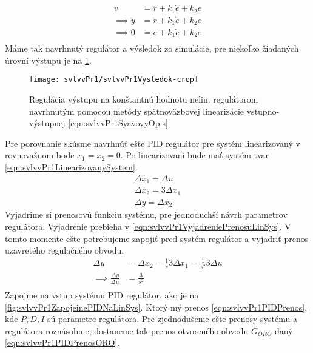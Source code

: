 \documentclass[../main.tex]{subfiles}
\begin{document}
	\begin{equation}
	\begin{aligned}
	v &= \ddot{r}  +k_1 \dot{e} + k_2 e \\
	\implies \ddot{y} &= \ddot{r}  +k_1 \dot{e} + k_2 e \\
	\implies 0 &= \ddot{e}  + k_1 \dot{e} + k_2 e \\
	\end{aligned}
	\label{eqn:svlvvPr1DynamikaOdchylky}
	\end{equation}
	Máme tak navrhnutý regulátor a výsledok zo simulácie, pre niekoľko žiadaných úrovní výstupu je na \cref{fig:svlvvPr1Vysledok}.
	\begin{figure}[h!]
		\centering
		\texttt{[image: svlvvPr1/svlvvPr1Vysledok-crop]}
		\caption{Regulácia výstupu na konštantnú hodnotu nelin. regulátorom navrhnutým pomocou metódy spätnoväzbovej linearizácie vstupno-výstupnej \cref{eqn:svlvvPr1SyavovyOpis}}
		\label{fig:svlvvPr1Vysledok}
	\end{figure}
	Pre porovnanie skúsme navrhnúť ešte PID regulátor pre systém linearizovaný v rovnovažnom bode $x_1 = x_2 = 0$. Po linearizovaní bude mať systém tvar \cref{eqn:svlvvPr1LinearizovanySystem}. 
	\begin{equation}
	\begin{gathered}
	\Delta \dot{x_1}  = \Delta u \\
	\Delta \dot{x_2} = 3\Delta x_1 \\
	\Delta y = \Delta  x_2
	\end{gathered}
	\label{eqn:svlvvPr1LinearizovanySystem}
	\end{equation}
	Vyjadrime si prenosovú funkciu systému, pre jednoduchší návrh parametrov regulátora. Vyjadrenie prebieha v \cref{eqn:svlvvPr1VyjadreniePrenosuLinSys}. V tomto momente ešte potrebujeme zapojiť pred systém regulátor a vyjadriť prenos uzavretého regulačného obvodu.
	\begin{equation}
	\begin{aligned}
		\Delta  y &= \Delta x_2 = \frac{1}{s}  3 \Delta x_1 = \frac{1}{s^2}  3 \Delta u \\
		\implies \frac{\Delta y}{\Delta u } &= \frac{3}{s^2} \\
	\end{aligned}
	\label{eqn:svlvvPr1VyjadreniePrenosuLinSys}
	\end{equation}
	Zapojme na vstup systému PID regulátor, ako je na \cref{fig:svlvvPr1ZapojeinePIDNaLinSys}. Ktorý mý prenos \cref{eqn:svlvvPr1PIDPrenos}, kde $P, D, I$ sú parametre regulátora. Pre zjednodušenie ešte prenosy systému a regulátora roznásobme, dostaneme tak prenos otvoreného obvodu $G_{ORO}$ daný \cref{eqn:svlvvPr1PIDPrenosORO}. 
\end{document}
